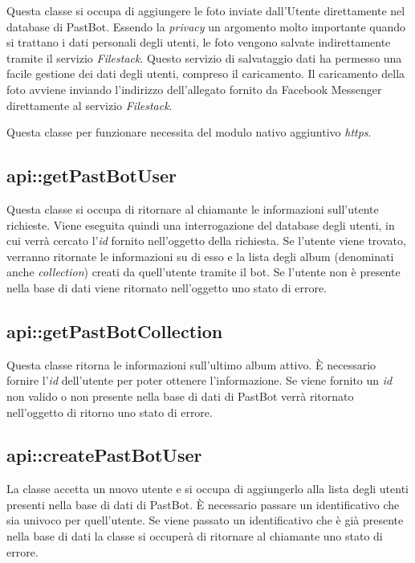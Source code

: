 Questa classe si occupa di aggiungere le foto inviate dall'Utente direttamente
nel database di PastBot. Essendo la \textit{privacy} un argomento molto
importante quando si trattano i dati personali degli utenti, le foto vengono
salvate indirettamente tramite il servizio \textit{Filestack}. Questo
servizio di salvataggio dati ha permesso una facile gestione dei dati degli
utenti, compreso il caricamento. Il caricamento della foto avviene inviando
l'indirizzo dell'allegato fornito da Facebook Messenger direttamente al
servizio \textit{Filestack}.


Questa classe per funzionare necessita del modulo nativo aggiuntivo
\textit{https}.

\subsection{api::getPastBotUser}

Questa classe si occupa di ritornare al chiamante le informazioni sull'utente
richieste. Viene eseguita quindi una interrogazione del database degli utenti,
in cui verrà cercato l'\textit{id} fornito nell'oggetto della richiesta. Se
l'utente viene trovato, verranno ritornate le informazioni su di esso e la
lista degli album (denominati anche \textit{collection}) creati da quell'utente
tramite il bot.
Se l'utente non è presente nella base di dati viene ritornato nell'oggetto uno
stato di errore.

\subsection{api::getPastBotCollection}

Questa classe ritorna le informazioni sull'ultimo album attivo. È necessario
fornire l'\textit{id} dell'utente per poter ottenere l'informazione.
Se viene fornito un \textit{id} non valido o non presente nella base di dati di
PastBot verrà ritornato nell'oggetto di ritorno uno stato di errore.

\subsection{api::createPastBotUser}

La classe accetta un nuovo utente e si occupa di aggiungerlo alla lista
degli utenti presenti nella base di dati di PastBot. È necessario passare un
identificativo che sia univoco per quell'utente. Se viene passato un
identificativo che è già presente nella base di dati la classe si occuperà di
ritornare al chiamante uno stato di errore.

